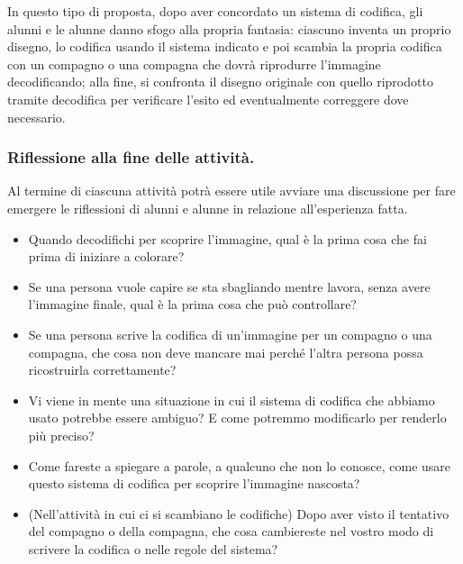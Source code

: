 \ruoliattivita{\ruoloProgrammatore\quad\ruoloEsecutore}

In questo tipo di proposta, dopo aver concordato un sistema di codifica, gli alunni e le alunne danno sfogo alla propria fantasia: ciascuno inventa un proprio disegno, lo codifica usando il sistema indicato e poi scambia la propria codifica con un compagno o una compagna che dovrà riprodurre l'immagine decodificando; alla fine, si confronta il disegno originale con quello riprodotto tramite decodifica per verificare l'esito ed eventualmente correggere dove necessario.

\subsubsection{Riflessione alla fine delle attività.}

Al termine di ciascuna attività potrà essere utile avviare una discussione per fare emergere le riflessioni di alunni e alunne in relazione all'esperienza fatta.

\begin{domandestimolo}\label{domande-stimolo-9}

\begin{itemize}
\item
  Quando decodifichi per scoprire l'immagine, qual è la prima cosa che fai prima di iniziare a colorare?
\item
  Se una persona vuole capire se sta sbagliando mentre lavora, senza avere l'immagine finale, qual è la prima cosa che può controllare?
\item
  Se una persona scrive la codifica di un'immagine per un compagno o una compagna, che cosa non deve mancare mai perché l'altra persona possa ricostruirla correttamente?
\item
  Vi viene in mente una situazione in cui il sistema di codifica che abbiamo usato potrebbe essere ambiguo? E come potremmo modificarlo per renderlo più preciso?
\item
  Come fareste a spiegare a parole, a qualcuno che non lo conosce, come usare questo sistema di codifica per scoprire l'immagine nascosta?
\item
  (Nell'attività in cui ci si scambiano le codifiche) Dopo aver visto il tentativo del compagno o della compagna, che cosa cambiereste nel vostro modo di scrivere la codifica o nelle regole del sistema?
\end{itemize}
\end{domandestimolo}

